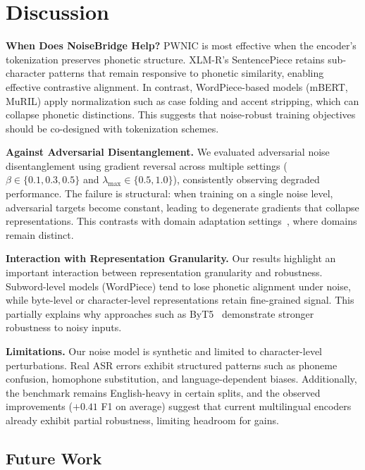 \documentclass[conference]{IEEEtran}
\begin{document}
\section{Discussion}
\label{sec:discussion}

\textbf{When Does NoiseBridge Help?}
PWNIC is most effective when the encoder's tokenization preserves phonetic structure. XLM-R's SentencePiece retains sub-character patterns that remain responsive to phonetic similarity, enabling effective contrastive alignment. In contrast, WordPiece-based models (mBERT, MuRIL) apply normalization such as case folding and accent stripping, which can collapse phonetic distinctions. This suggests that noise-robust training objectives should be co-designed with tokenization schemes.

\textbf{Against Adversarial Disentanglement.}
We evaluated adversarial noise disentanglement using gradient reversal across multiple settings ($\beta \in \{0.1, 0.3, 0.5\}$ and $\lambda_{\max} \in \{0.5, 1.0\}$), consistently observing degraded performance. The failure is structural: when training on a single noise level, adversarial targets become constant, leading to degenerate gradients that collapse representations. This contrasts with domain adaptation settings~\cite{ganin2016domain}, where domains remain distinct.

\textbf{Interaction with Representation Granularity.}
Our results highlight an important interaction between representation granularity and robustness. Subword-level models (WordPiece) tend to lose phonetic alignment under noise, while byte-level or character-level representations retain fine-grained signal. This partially explains why approaches such as ByT5~\cite{xue2022byt5} demonstrate stronger robustness to noisy inputs.

\textbf{Limitations.}
Our noise model is synthetic and limited to character-level perturbations. Real ASR errors exhibit structured patterns such as phoneme confusion, homophone substitution, and language-dependent biases. Additionally, the benchmark remains English-heavy in certain splits, and the observed improvements ($+0.41$ F1 on average) suggest that current multilingual encoders already exhibit partial robustness, limiting headroom for gains.

\subsection{Future Work}
\end{document}
